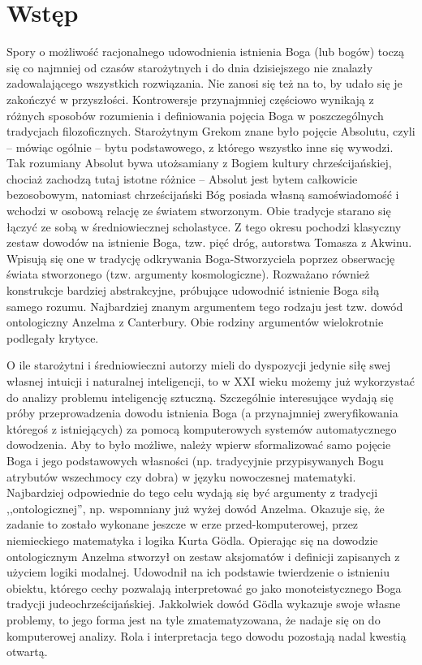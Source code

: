 \documentclass[
	runningheads
]{llncs}
\begin{document}
\section{Wstęp} \label{sec:intro}
Spory o możliwość racjonalnego udowodnienia istnienia Boga (lub bogów) toczą się co najmniej od czasów starożytnych i do dnia dzisiejszego nie znalazły zadowalającego wszystkich rozwiązania. Nie zanosi się też na to, by udało się je zakończyć w przyszłości. Kontrowersje przynajmniej częściowo wynikają z różnych sposobów rozumienia i definiowania pojęcia Boga w poszczególnych tradycjach filozoficznych. Starożytnym Grekom znane było pojęcie Absolutu, czyli -- mówiąc ogólnie -- bytu podstawowego, z którego wszystko inne się wywodzi. Tak rozumiany Absolut bywa utożsamiany z Bogiem kultury chrześcijańskiej, chociaż zachodzą tutaj istotne różnice -- Absolut jest  bytem całkowicie bezosobowym, natomiast chrześcijański Bóg posiada własną samoświadomość i wchodzi w osobową relację ze światem stworzonym. Obie tradycje starano się łączyć ze sobą w średniowiecznej scholastyce. Z tego okresu pochodzi klasyczny zestaw dowodów na istnienie Boga, tzw. pięć dróg, autorstwa Tomasza z Akwinu. Wpisują się one w tradycję odkrywania Boga-Stworzyciela poprzez obserwację świata stworzonego (tzw. argumenty kosmologiczne). Rozważano również konstrukcje bardziej abstrakcyjne, próbujące udowodnić istnienie Boga siłą samego rozumu. Najbardziej znanym argumentem tego rodzaju jest tzw. dowód ontologiczny Anzelma z Canterbury. Obie rodziny argumentów wielokrotnie podlegały krytyce. 

O ile starożytni i średniowieczni autorzy mieli do dyspozycji jedynie siłę swej własnej intuicji i naturalnej inteligencji, to w XXI wieku możemy już wykorzystać do analizy problemu inteligencję sztuczną. Szczególnie interesujące wydają się próby przeprowadzenia dowodu istnienia Boga (a przynajmniej zweryfikowania któregoś z istniejących) za pomocą komputerowych systemów automatycznego dowodzenia. Aby to było możliwe, należy wpierw sformalizować samo pojęcie Boga i jego podstawowych własności (np. tradycyjnie przypisywanych Bogu atrybutów wszechmocy czy dobra) w języku nowoczesnej matematyki. Najbardziej odpowiednie do tego celu wydają się być argumenty z tradycji ,,ontologicznej'', np. wspomniany już wyżej dowód Anzelma. Okazuje się, że zadanie to zostało wykonane jeszcze w erze przed-komputerowej, przez niemieckiego matematyka i logika Kurta G\"odla. Opierając się na dowodzie ontologicznym Anzelma stworzył on zestaw aksjomatów i definicji zapisanych z użyciem logiki modalnej. Udowodnił na ich podstawie twierdzenie o istnieniu obiektu, którego cechy pozwalają interpretować go jako monoteistycznego Boga tradycji judeochrześcijańskiej. Jakkolwiek dowód G\"odla wykazuje swoje własne problemy, to jego forma jest na tyle zmatematyzowana, że nadaje się on do komputerowej analizy. Rola i interpretacja tego dowodu pozostają nadal kwestią otwartą. 
\end{document}
